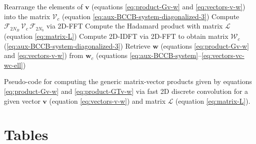 \documentclass[utf8]{FrontiersinHarvard} %
\begin{document}
	\begin{algorithm}
		Rearrange the elements of $\mathbf{v}$ (equations \ref{eq:product-Gv-w} and \ref{eq:vectors-v-w}) into the 
		matrix $\boldsymbol{\mathcal{V}}_{c}$ (equation \ref{eq:aux-BCCB-system-diagonalized-3})\; 
		Compute $\boldsymbol{\mathcal{F}}_{2N_{B}} \, \boldsymbol{\mathcal{V}}_{c} \, \boldsymbol{\mathcal{F}}_{2N_{b}}$ via 2D-FFT\;
		Compute the Hadamard product with matrix $\boldsymbol{\mathcal{L}}$ (equation \ref{eq:matrix-L})\;
		Compute 2D-IDFT via 2D-FFT to obtain matrix $\boldsymbol{\mathcal{W}}_{c}$ (\ref{eq:aux-BCCB-system-diagonalized-3})\;
		Retrieve $\mathbf{w}$ (equations \ref{eq:product-Gv-w} and \ref{eq:vectors-v-w}) from $\mathbf{w}_{c}$
		(equations \ref{eq:aux-BCCB-system}--\ref{eq:vectors-vc-wc-ell})\;
		\caption{Pseudo-code for computing the generic matrix-vector products given by equations \ref{eq:product-Gv-w} 
			and \ref{eq:product-GTv-w} via fast 2D discrete convolution for a given vector $\mathbf{v}$ (equation \ref{eq:vectors-v-w}) 
			and matrix $\boldsymbol{\mathcal{L}}$ (equation \ref{eq:matrix-L}).}
		\label{alg:fast-2D-convolution}
	\end{algorithm}

	\section{Tables}
	
\end{document}
